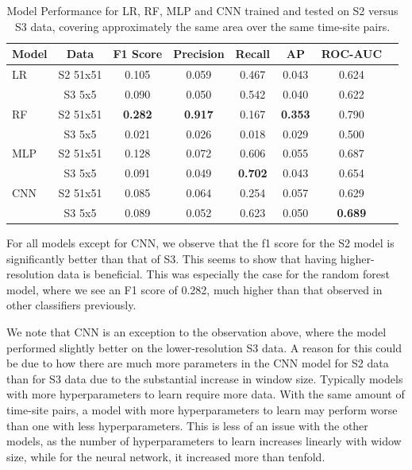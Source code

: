 \documentclass[a4paper,11pt]{report}
\begin{document}
    \begin{table}[h]
        \caption{Model Performance for LR, RF, MLP and CNN trained and tested on S2 versus S3 data, covering approximately the same area over the same time-site pairs.}
        \label{tab:s2_s3_model_comparison}
        \centering
        \begin{tabular}{lccccccc}
        \toprule
        \textbf{Model} & \textbf{Data} & \textbf{F1 Score} & \textbf{Precision} & \textbf{Recall} & \textbf{AP} & \textbf{ROC-AUC} \\
        \midrule
        LR & S2 51x51 & 0.105 & 0.059 & 0.467 & 0.043 & 0.624 \\
         & S3 5x5 & 0.090 & 0.050 & 0.542 & 0.040 & 0.622 \\ \midrule
        RF & S2 51x51 & \textbf{0.282} & \textbf{0.917}	& 0.167	& \textbf{0.353} & 0.790 \\
         & S3 5x5 & 0.021 & 0.026 & 0.018 & 0.029 & 0.500 \\ \midrule
        MLP & S2 51x51 & 0.128 & 0.072 & 0.606 & 0.055 & 0.687 \\
         & S3 5x5 & 0.091 & 0.049 & \textbf{0.702} & 0.043 & 0.654  \\ \midrule
        CNN & S2 51x51 & 0.085 & 0.064 & 0.254 & 0.057 & 0.629    \\
         & S3 5x5 & 0.089 & 0.052 & 0.623 & 0.050 & \textbf{0.689}   \\ \bottomrule
        \end{tabular}
    \end{table}

For all models except for CNN, we observe that the f1 score for the S2 model is significantly better than that of S3. This seems to show that having higher-resolution data is beneficial. This was especially the case for the random forest model, where we see an F1 score of 0.282, much higher than that observed in other classifiers previously. 

We note that CNN is an exception to the observation above, where the model performed slightly better on the lower-resolution S3 data. A reason for this could be due to how there are much more parameters in the CNN model for S2 data than for S3 data due to the substantial increase in window size. Typically models with more hyperparameters to learn require more data. With the same amount of time-site pairs, a model with more hyperparameters to learn may perform worse than one with less hyperparameters. This is less of an issue with the other models, as the number of hyperparameters to learn increases linearly with widow size, while for the neural network, it increased more than tenfold. 
\end{document}
